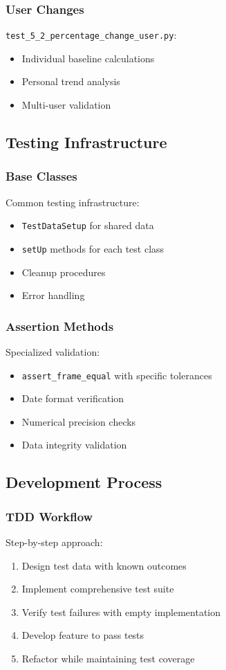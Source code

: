 \subsubsection{User Changes}
\texttt{test\_5\_2\_percentage\_change\_user.py}:
\begin{itemize}
    \item Individual baseline calculations
    \item Personal trend analysis
    \item Multi-user validation
\end{itemize}

\subsection{Testing Infrastructure}

\subsubsection{Base Classes}
Common testing infrastructure:
\begin{itemize}
    \item \texttt{TestDataSetup} for shared data
    \item \texttt{setUp} methods for each test class
    \item Cleanup procedures
    \item Error handling
\end{itemize}

\subsubsection{Assertion Methods}
Specialized validation:
\begin{itemize}
    \item \texttt{assert\_frame\_equal} with specific tolerances
    \item Date format verification
    \item Numerical precision checks
    \item Data integrity validation
\end{itemize}

\subsection{Development Process}

\subsubsection{TDD Workflow}
Step-by-step approach:
\begin{enumerate}
    \item Design test data with known outcomes
    \item Implement comprehensive test suite
    \item Verify test failures with empty implementation
    \item Develop feature to pass tests
    \item Refactor while maintaining test coverage
\end{enumerate}

